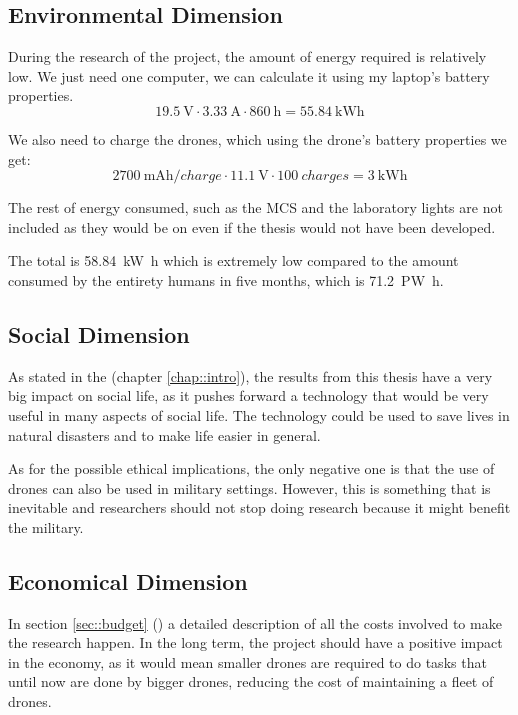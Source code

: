 \subsection{Environmental Dimension}
During the research of the project, the amount of energy required is relatively low. We just need one computer, we can calculate it using my laptop's battery properties.
\begin{equation*}
\SI{19.5}{\volt} \cdot \SI{3.33}{\ampere} \cdot \SI{860}{\hour} = \SI{55.84}{\kilo\watt\hour}
\end{equation*}

We also need to charge the drones, which using the drone's battery properties we get:
\begin{equation*}
\SI[parse-numbers=true]{2700}{\milli\ampere\hour\per charge} \cdot \SI{11.1}{\volt} \cdot \SI{100}{charges} = \SI{3}{\kilo\watt\hour}
\end{equation*}

The rest of energy consumed, such as the \ac{MCS} and the laboratory lights are not included as they would be on even if the thesis would not have been developed. 

The total is \SI{58.84}{\kilo\watt\hour} which is extremely low compared to the amount consumed by the entirety humans in five months, which is \SI[parse-numbers=true]{71.2}{\peta\watt\hour}.

\subsection{Social Dimension}

As stated in the   (chapter \ref{chap::intro}), the results from this thesis have a very big impact on social life, as it pushes forward a technology that would be very useful in many aspects of social life. The technology could be used to save lives in natural disasters and to make life easier in general.

As for the possible ethical implications, the only negative one is that the use of drones can also be used in military settings. However, this is something that is inevitable and researchers should not stop doing research because it might benefit the military.

\subsection{Economical Dimension}
In section \ref{sec::budget} () a detailed description of all the costs involved to make the research happen. In the long term, the project should have a positive impact in the economy, as it would mean smaller drones are required to do tasks that until now are done by bigger drones, reducing the cost of maintaining a fleet of drones.

